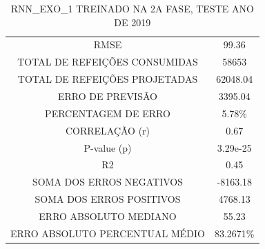         \begin{table}[!ht]
            \centering
            \caption{RNN\_EXO\_1 TREINADO NA 2A FASE, TESTE ANO DE 2019}
            \label{table:case2_rnn_exo_2_2019}
                \begin{tabular}{|c|c|}
                \rowcolor{gray!50}
                \hline
                \multicolumn{2}{c}{RNN\_EXO\_1 TREINADO NA 2A FASE, TESTE ANO DE 2019}\\ \hline
                RMSE & 99.36\\
                TOTAL DE REFEIÇÕES CONSUMIDAS & 58653 \\
                TOTAL DE REFEIÇÕES PROJETADAS & 62048.04\\
                ERRO DE PREVISÃO & 3395.04 \\
                PERCENTAGEM DE ERRO & 5.78\%  \\
                CORRELAÇÃO (r)& 0.67 \\
                P-value (p) & 3.29e-25\\
                R2 & 0.45\\
                SOMA DOS ERROS NEGATIVOS & -8163.18\\
                SOMA DOS ERROS POSITIVOS & 4768.13\\
                ERRO ABSOLUTO MEDIANO & 55.23\\
                ERRO ABSOLUTO PERCENTUAL MÉDIO & 83.2671\% \\ \hline
            \end{tabular}
            \end{table}



